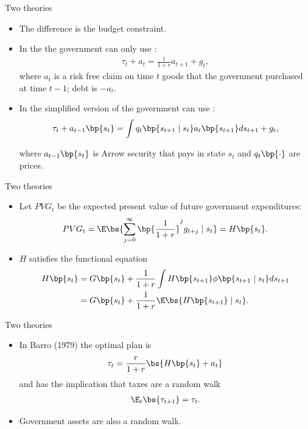 \documentclass[11pt,xcolor={dvipsnames},aspectratio=159,hyperref={pdftex,pdfpagemode=UseNone,hidelinks,pdfdisplaydoctitle=true},usepdftitle=false]{beamer}
\begin{document}
\begin{frame}{Two theories}
    \begin{itemize}
    \item The  difference is the budget constraint.
    \item In the  the government can only use : 
    \begin{align*}
     \tau_t + a_t = \frac{1}{1+r} a_{t+1} + g_t, 
    \end{align*}     where $a_t$ is a risk free claim on time $t$ goods that the
    government purchased at time $t-1$; debt is $-a_t$.
    \item In the simplified version of  the government can use :
    \begin{align*}
        \tau_t + a_{t-1}\bp{s_t} = \int q_t\bp{s_{t+1} \mid s_t } a_{t}\bp{s_{t+1}} ds_{t+1} + g_t, 
       \end{align*} 
    
    where $a_{t-1}\bp{s_t}$ is Arrow security that pays in state $s_t$ and $q_t\bp{\cdot}$ are prices. 
    \end{itemize}
    \end{frame}

\begin{frame}{Two theories}
    \begin{itemize}
        \item Let $PVG_t$ be the expected present value of future government expenditures: 
        \begin{align*}
            PVG_t = \E \bs{\sum_{j=0}^\infty \bp{\frac{1}{1+r}}^j g_{t+j}\mid s_t } = H\bp{s_t}.
        \end{align*}

        \item $H$ satisfies the functional equation
        \begin{align*}
            H\bp{s_t} & = G\bp{s_t} + \frac{1}{1+r} \int H\bp{s_{t+1}}  \phi\bp{s_{t+1}\mid s_t } ds_{t+1} \\
            & = G\bp{s_t} + \frac{1}{1+r} \E \bs{H\bp{s_{t+1}} \mid s_t }.
        \end{align*}
    \end{itemize}
\end{frame}


\begin{frame}{Two theories}
    \begin{itemize}
    \item In Barro (1979) the optimal plan is 
    \begin{align*}  
    \tau_t = \frac{r}{1+r}\bs{H\bp{s_t}+a_t}
    \end{align*}
    and has the implication that taxes are a random walk
    \begin{align*}  
        \E_{t}\bs{\tau_{t+1}} = \tau_t.
        \end{align*}
        \item Government assets are also a random walk.
    \end{itemize}
    \end{frame}
\end{document}
